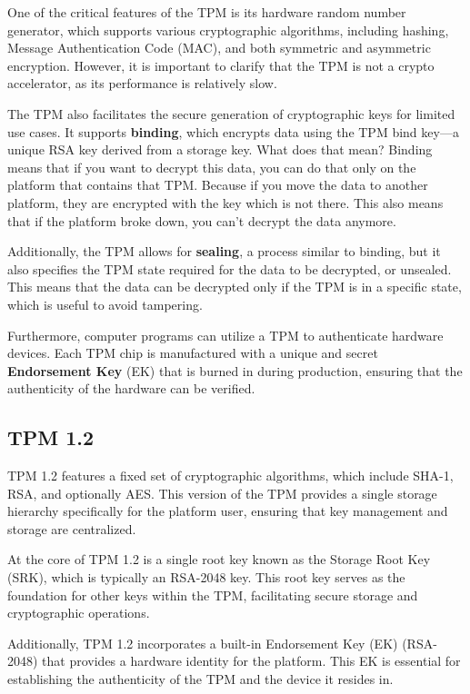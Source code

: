One of the critical features of the TPM is its hardware random number
generator, which supports various cryptographic algorithms, including
hashing, Message Authentication Code (MAC), and both symmetric and
asymmetric encryption. However, it is important to clarify that the
TPM is not a crypto accelerator, as its performance is relatively
slow.

The TPM also facilitates the secure generation of cryptographic keys
for limited use cases. It supports \textbf{binding}, which encrypts
data using the TPM bind key—a unique RSA key derived from a storage
key. What does that mean? Binding means that if you want to decrypt
this data, you can do that only on the platform that contains that
TPM. Because if you move the data to another platform, they are
encrypted with the key which is not there. This also means that if the
platform broke down, you can't decrypt the data anymore.

Additionally, the TPM allows for \textbf{sealing}, a process
similar to binding, but it also specifies the TPM state required for
the data to be decrypted, or unsealed. This means that the data can be 
decrypted only if the TPM is in a specific state, which is useful to
avoid tampering.

Furthermore, computer programs can utilize a TPM to authenticate
hardware devices. Each TPM chip is manufactured with a unique and
secret \textbf{Endorsement Key} (EK) that is burned in during
production, ensuring that the authenticity of the hardware can be
verified.

\subsection{TPM 1.2}

TPM 1.2 features a fixed set of cryptographic algorithms, which
include SHA-1, RSA, and optionally AES. This version of the TPM
provides a single storage hierarchy specifically for the platform
user, ensuring that key management and storage are centralized.

At the core of TPM 1.2 is a single root key known as the Storage Root
Key (SRK), which is typically an RSA-2048 key. This root key serves as
the foundation for other keys within the TPM, facilitating secure
storage and cryptographic operations.

Additionally, TPM 1.2 incorporates a built-in Endorsement Key (EK)
(RSA-2048) that provides a hardware identity for the platform. This EK
is essential for establishing the authenticity of the TPM and the
device it resides in. 

